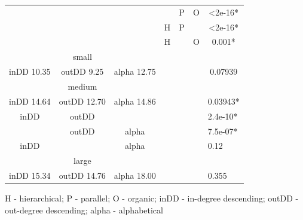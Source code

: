 \documentclass{l4proj}
\begin{document}
\begin{table}[H]
\begin{tabular}{|c|c|c|c|c|c|c|}
\multicolumn{3}{|c|}{\cellcolor{gray}}                    & \cellcolor{gray} & P    & O           & \textless2e-16*               \\ \cline{4-7} 
\multicolumn{3}{|c|}{\cellcolor{gray}}                    & H           & P	&\cellcolor{gray}    & \textless2e-16*               \\ \cline{4-7} 
\multicolumn{3}{|c|}{\cellcolor{gray}}                    & H           & \cellcolor{gray} & O    & 0.001*                        \\ \hline
\multicolumn{3}{|c|}{small}               & \multicolumn{3}{c|}{\multirow{9}{*}{\cellcolor{gray}}}  &                              \cellcolor{gray} \\ \cline{1-3} \cline{7-7} 
inDD 10.35   & outDD 9.25   & alpha 12.75 & \multicolumn{3}{c|}{\cellcolor{gray}}                   & 0.07939                       \\ \cline{1-3} \cline{7-7} 
\multicolumn{3}{|c|}{medium}              & \multicolumn{3}{c|}{\cellcolor{gray}}                   &                              \cellcolor{gray} \\ \cline{1-3} \cline{7-7} 
inDD 14.64   & outDD 12.70  & alpha 14.86 & \multicolumn{3}{c|}{\cellcolor{gray}}                   & \multicolumn{1}{l|}{0.03943*} \\ \cline{1-3} \cline{7-7} 
inDD         & {outDD} &\cellcolor{gray} & \multicolumn{3}{c|}{\cellcolor{gray}}                   & \multicolumn{1}{l|}{2.4e-10*} \\ \cline{1-3} \cline{7-7} 
\cellcolor{gray}& outDD & alpha       & \multicolumn{3}{c|}{\cellcolor{gray}}                   & \multicolumn{1}{l|}{7.5e-07*} \\ \cline{1-3} \cline{7-7} 
inDD &\cellcolor{gray} &  alpha       & \multicolumn{3}{c|}{\cellcolor{gray}}                   & \multicolumn{1}{l|}{0.12}     \\ \cline{1-3} \cline{7-7} 
\multicolumn{3}{|c|}{large}               & \multicolumn{3}{c|}{\cellcolor{gray}}                   & \multicolumn{1}{l|}{\cellcolor{gray}}         \\ \cline{1-3} \cline{7-7} 
inDD 15.34   & outDD 14.76  & alpha 18.00 & \multicolumn{3}{c|}{\cellcolor{gray}}                   & \multicolumn{1}{l|}{0.355}    \\ \hline

\end{tabular}
\end{table}

H - hierarchical; P - parallel; O - organic; inDD - in-degree descending; outDD - out-degree descending; alpha - alphabetical
\end{document}
